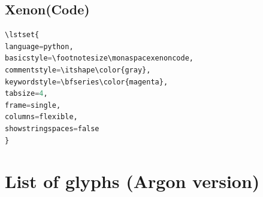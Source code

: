 \documentclass[a4paper]{scrartcl}
\begin{document}




\pagebreak

\subsection{Xenon(Code)}

\begin{lstlisting}[language=python,basicstyle=\footnotesize\monaspacexenoncode,commentstyle=\itshape\color{gray},keywordstyle=\bfseries\color{magenta},tabsize=4,frame=single,columns=flexible,showstringspaces=false]
\lstset{
language=python,
basicstyle=\footnotesize\monaspacexenoncode,
commentstyle=\itshape\color{gray},
keywordstyle=\bfseries\color{magenta},
tabsize=4,
frame=single,
columns=flexible,
showstringspaces=false
}
\end{lstlisting}





\pagebreak

\section{List of glyphs (Argon version)}

\end{document}
